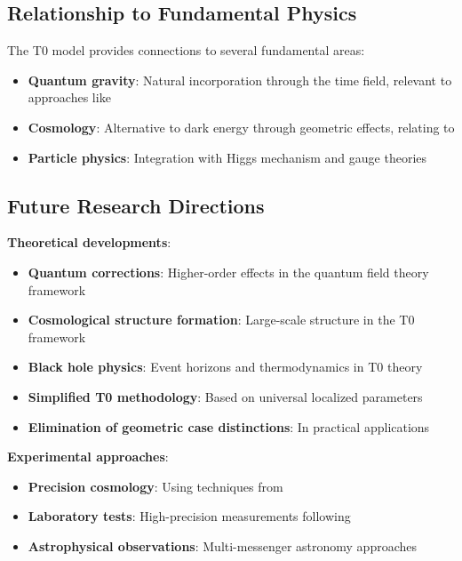 \documentclass[12pt,a4paper]{article}
\begin{document}
	\subsection{Relationship to Fundamental Physics}
	\label{subsec:fundamental_physics}
	
	The T0 model provides connections to several fundamental areas:
	\begin{itemize}
		\item \textbf{Quantum gravity}: Natural incorporation through the time field, relevant to approaches like \citep{thiemann2007,rovelli2004}
		\item \textbf{Cosmology}: Alternative to dark energy through geometric effects, relating to \citep{weinberg2008,peebles1993}
		\item \textbf{Particle physics}: Integration with Higgs mechanism and gauge theories \citep{weinberg2003,peskin1995}
	\end{itemize}
	
	\subsection{Future Research Directions}
	\label{subsec:future_research}
	
	\textbf{Theoretical developments}:
	\begin{itemize}
		\item \textbf{Quantum corrections}: Higher-order effects in the quantum field theory framework
		\item \textbf{Cosmological structure formation}: Large-scale structure in the T0 framework
		\item \textbf{Black hole physics}: Event horizons and thermodynamics in T0 theory
		\item \textbf{Simplified T0 methodology}: Based on universal localized parameters
		\item \textbf{Elimination of geometric case distinctions}: In practical applications
	\end{itemize}
	
	\textbf{Experimental approaches}:
	\begin{itemize}
		\item \textbf{Precision cosmology}: Using techniques from \citep{weinberg2008,planck2020}
		\item \textbf{Laboratory tests}: High-precision measurements following \citep{will2014}
		\item \textbf{Astrophysical observations}: Multi-messenger astronomy approaches \citep{abbott2017}
	\end{itemize}
	
\end{document}
